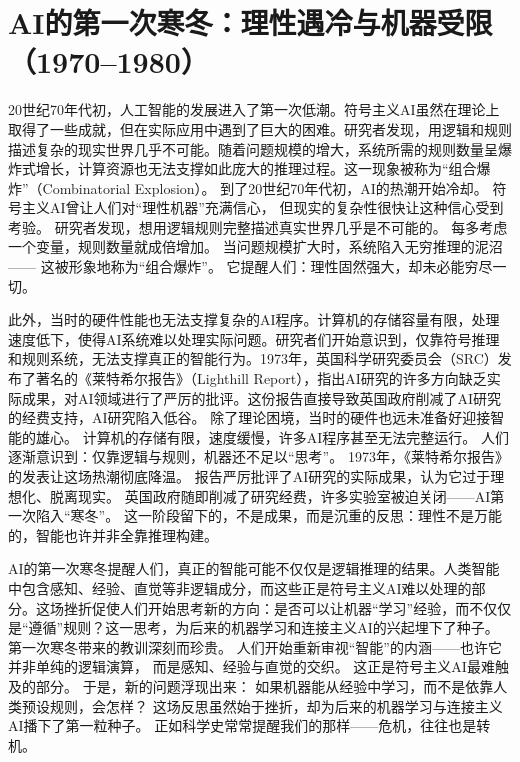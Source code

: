 \section{AI的第一次寒冬：理性遇冷与机器受限（1970–1980）}

20世纪70年代初，人工智能的发展进入了第一次低潮。符号主义AI虽然在理论上取得了一些成就，但在实际应用中遇到了巨大的困难。研究者发现，用逻辑和规则描述复杂的现实世界几乎不可能。随着问题规模的增大，系统所需的规则数量呈爆炸式增长，计算资源也无法支撑如此庞大的推理过程。这一现象被称为“组合爆炸”（Combinatorial Explosion）。
到了20世纪70年代初，AI的热潮开始冷却。  
符号主义AI曾让人们对“理性机器”充满信心，  
但现实的复杂性很快让这种信心受到考验。  
研究者发现，想用逻辑规则完整描述真实世界几乎是不可能的。  
每多考虑一个变量，规则数量就成倍增加。  
当问题规模扩大时，系统陷入无穷推理的泥沼——  
这被形象地称为“组合爆炸”。  
它提醒人们：理性固然强大，却未必能穷尽一切。  

此外，当时的硬件性能也无法支撑复杂的AI程序。计算机的存储容量有限，处理速度低下，使得AI系统难以处理实际问题。研究者们开始意识到，仅靠符号推理和规则系统，无法支撑真正的智能行为。1973年，英国科学研究委员会（SRC）发布了著名的《莱特希尔报告》（Lighthill Report），指出AI研究的许多方向缺乏实际成果，对AI领域进行了严厉的批评。这份报告直接导致英国政府削减了AI研究的经费支持，AI研究陷入低谷。
除了理论困境，当时的硬件也远未准备好迎接智能的雄心。  
计算机的存储有限，速度缓慢，许多AI程序甚至无法完整运行。  
人们逐渐意识到：仅靠逻辑与规则，机器还不足以“思考”。  
1973年，《莱特希尔报告》的发表让这场热潮彻底降温。  
报告严厉批评了AI研究的实际成果，认为它过于理想化、脱离现实。  
英国政府随即削减了研究经费，许多实验室被迫关闭——AI第一次陷入“寒冬”。  
这一阶段留下的，不是成果，而是沉重的反思：理性不是万能的，智能也许并非全靠推理构建。  

AI的第一次寒冬提醒人们，真正的智能可能不仅仅是逻辑推理的结果。人类智能中包含感知、经验、直觉等非逻辑成分，而这些正是符号主义AI难以处理的部分。这场挫折促使人们开始思考新的方向：是否可以让机器“学习”经验，而不仅仅是“遵循”规则？这一思考，为后来的机器学习和连接主义AI的兴起埋下了种子。
第一次寒冬带来的教训深刻而珍贵。  
人们开始重新审视“智能”的内涵——也许它并非单纯的逻辑演算，  
而是感知、经验与直觉的交织。  
这正是符号主义AI最难触及的部分。  
于是，新的问题浮现出来：  
如果机器能从经验中学习，而不是依靠人类预设规则，会怎样？  
这场反思虽然始于挫折，却为后来的机器学习与连接主义AI播下了第一粒种子。  
正如科学史常常提醒我们的那样——危机，往往也是转机。  

